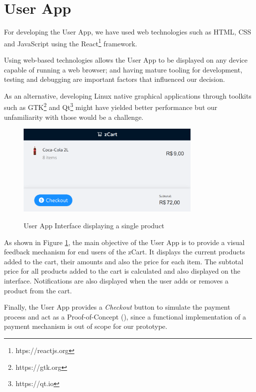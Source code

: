 \section{User App}

For developing the User App, we have used web technologies such 
as HTML, CSS \cite{Duckett2011} and JavaScript \cite{Flanagan2020} using the 
React\footnote{htps://reactjs.org} framework. 

Using web-based technologies allows the User App to be displayed on any 
device capable of running a web browser; and having mature tooling for 
development, testing and debugging are important factors that influenced 
our decision.

As an alternative, developing Linux native graphical applications through
toolkits such as GTK\footnote{https://gtk.org} and Qt\footnote{https://qt.io}
might have yielded better performance but our unfamiliarity with those would be
a challenge.

\begin{figure}[H]
	\centering
	\caption[User App Interface display a single product]{User App Interface displaying a single product}
    \includegraphics[width=0.8\textwidth]{./images/ui.png}
	\fonte{}
	\label{fig:userapp}
\end{figure}

As shown in Figure \ref{fig:userapp}, the main objective of the User App is to
provide a visual feedback mechanism for end users of the zCart. It displays the
current products added to the cart, their amounts and also the price for each
item. The subtotal price for all products added to the cart is calculated and
also displayed on the interface. Notifications are also displayed when the user
adds or removes a product from the cart. 

Finally, the User App provides a \textit{Checkout} button to simulate the payment process
and act as a Proof-of-Concept (), since a functional
implementation of a payment mechanism is out of scope for our prototype.

